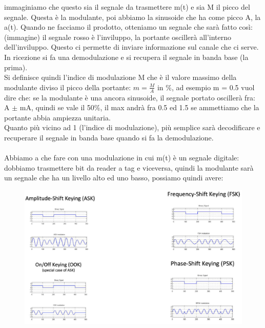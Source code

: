 \documentclass[oneside, 12pt]{extbook}
\begin{document}
immaginiamo che questo sia il segnale da trasmettere m(t) e sia M il picco del segnale. Questa è la modulante, poi abbiamo la sinusoide che ha come picco A, la a(t). Quando ne facciamo il prodotto, otteniamo un segnale che sarà fatto così: (immagine) il segnale rosso è l'inviluppo, la portante oscillerà all'interno dell'inviluppo. Questo ci permette di inviare informazione sul canale che ci serve. In ricezione si fa una demodulazione e si recupera il segnale in banda base (la prima).\\Si definisce quindi l'indice di modulazione M che è il valore massimo della modulante diviso il picco della portante: $m = \frac{M}{A}$ in \%, ad esempio m = 0.5 vuol dire che: se la modulante è una ancora sinusoide, il segnale portato oscillerà fra: A $\pm$ mA, quindi se vale il 50\%, il max andrà fra 0.5 ed 1.5 se ammettiamo che la portante abbia ampiezza unitaria.\\Quanto più vicino ad 1 (l'indice di modulazione), più semplice sarà decodificare e recuperare il segnale in banda base quando si fa la demodulazione.\\\\Abbiamo a che fare con una modulazione in cui m(t) è un segnale digitale: dobbiamo trasmettere bit da reader a tag e viceversa, quindi la modulante sarà un segnale che ha un livello alto ed uno basso, possiamo quindi avere:\\
\begin{figure}[!h]
	\includegraphics[scale=0.2]{immagini/modulazioni-differenti.png}
\end{figure}
\end{document}
